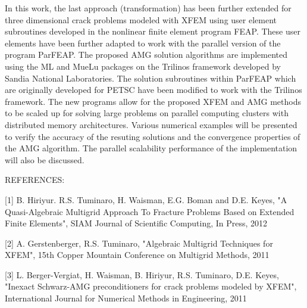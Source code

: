 \documentclass{report}
\begin{document}
In this work, the last approach (transformation) has been further
extended for three dimensional crack problems modeled with XFEM using
user element subroutines developed in the nonlinear finite element
program FEAP. These user elements have been further adapted to work with
the parallel version of the program ParFEAP. The proposed AMG solution
algorithms are implemented using the ML and MueLu packages on the
Trilinos framework developed by Sandia National Laboratories. The
solution subroutines within ParFEAP which are originally developed for
PETSC have been modified to work with the Trilinos framework. The new
programs allow for the proposed XFEM and AMG methods to be scaled up for
solving large problems on parallel computing clusters with distributed
memory architectures. Various numerical examples will be presented to
verify the accuracy of the resuting solutions and the convergence
properties of the AMG algorithm. The parallel scalability performance of
the implementation will also be discussed.

REFERENCES:

[1] B. Hiriyur. R.S. Tuminaro, H. Waisman, E.G. Boman and D.E. Keyes, "A
Quasi-Algebraic Multigrid Approach To Fracture Problems Based on Extended
Finite Elements", SIAM Journal of Scientific Computing, In Press, 2012

[2] A. Gerstenberger, R.S. Tuminaro, "Algebraic Multigrid Techniques for
XFEM", 15th Copper Mountain Conference on Multigrid Methods, 2011

[3] L. Berger-Vergiat, H. Waisman, B. Hiriyur, R.S. Tuminaro, D.E. Keyes,
"Inexact Schwarz-AMG preconditioners for crack problems modeled by XFEM",
International Journal for Numerical Methods in Engineering, 2011
\end{document}
